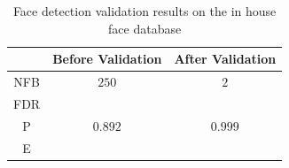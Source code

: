 \documentclass[times, 10pt,twocolumn]{article}
\begin{document}
\begin{table}[ht]
 \begin{tabular}{|c||c|c|}
   \hline
    & Before Validation & After Validation \\
    \hline
    \hline
   NFB & $250$  &  $2$\\
   FDR &  & \\
   P & $0.892$ & $0.999$ \\
   E &  &  \\
   \hline
 \end{tabular}
  \vspace{0.2in}
    \caption{Face detection validation results on the in house face database}
   \label{Tab:Inhouse}
   \end{table}








\nocite{ex1,ex2}


\end{document}

